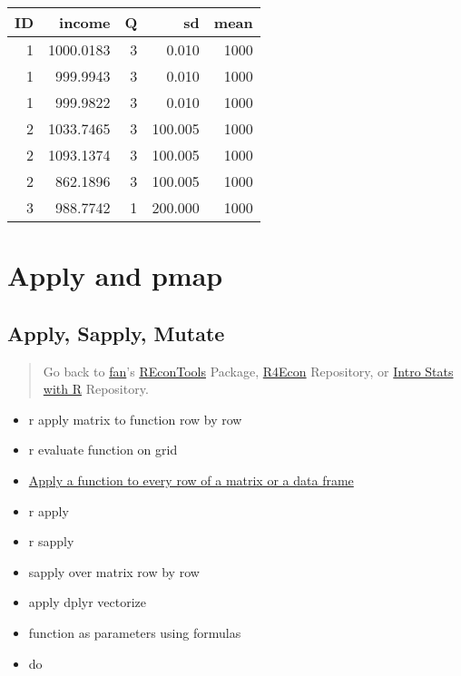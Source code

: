\documentclass[
]{book}
\newenvironment{Shaded}{\begin{snugshade}}{\end{snugshade}}
\newcommand{\KeywordTok}[1]{\textcolor[rgb]{0.13,0.29,0.53}{\textbf{#1}}}
\newcommand{\NormalTok}[1]{#1}
\newcommand{\OperatorTok}[1]{\textcolor[rgb]{0.81,0.36,0.00}{\textbf{#1}}}
\newcommand{\StringTok}[1]{\textcolor[rgb]{0.31,0.60,0.02}{#1}}
\providecommand{\tightlist}{%
  \setlength{\itemsep}{0pt}\setlength{\parskip}{0pt}}
\begin{document}
\begin{Shaded}
\end{Shaded}

\begin{table}[!h]
\centering
\begin{tabular}{r|r|r|r|r}
\hline
ID & income & Q & sd & mean\\
\hline
\rowcolor{gray!6}  1 & 1000.0183 & 3 & 0.010 & 1000\\
\hline
1 & 999.9943 & 3 & 0.010 & 1000\\
\hline
\rowcolor{gray!6}  1 & 999.9822 & 3 & 0.010 & 1000\\
\hline
2 & 1033.7465 & 3 & 100.005 & 1000\\
\hline
\rowcolor{gray!6}  2 & 1093.1374 & 3 & 100.005 & 1000\\
\hline
2 & 862.1896 & 3 & 100.005 & 1000\\
\hline
\rowcolor{gray!6}  3 & 988.7742 & 1 & 200.000 & 1000\\
\hline
\end{tabular}
\end{table}

\hypertarget{apply-and-pmap}{%
\section{Apply and pmap}\label{apply-and-pmap}}

\hypertarget{apply-sapply-mutate}{%
\subsection{Apply, Sapply, Mutate}\label{apply-sapply-mutate}}

\begin{quote}
Go back to \href{http://fanwangecon.github.io/CodeDynaAsset/}{fan}'s \href{https://fanwangecon.github.io/REconTools/}{REconTools} Package, \href{https://fanwangecon.github.io/R4Econ/}{R4Econ} Repository, or \href{https://fanwangecon.github.io/Stat4Econ/}{Intro Stats with R} Repository.
\end{quote}

\begin{itemize}
\tightlist
\item
  r apply matrix to function row by row
\item
  r evaluate function on grid
\item
  \href{https://stackoverflow.com/questions/4236368/apply-a-function-to-every-row-of-a-matrix-or-a-data-frame}{Apply a function to every row of a matrix or a data frame}
\item
  r apply
\item
  r sapply
\item
  sapply over matrix row by row
\item
  apply dplyr vectorize
\item
  function as parameters using formulas
\item
  do
\end{itemize}
\end{document}
